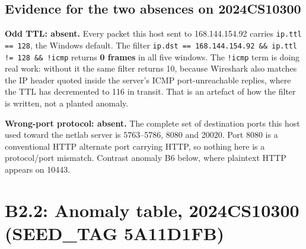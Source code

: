 \subsection{Evidence for the two absences on 2024CS10300}

\textbf{Odd TTL: absent.} Every packet this host sent to 168.144.154.92 carries
\texttt{ip.ttl == 128}, the Windows default. The filter
\texttt{ip.dst == 168.144.154.92 \&\& ip.ttl != 128 \&\& !icmp} returns \textbf{0 frames} in all
five windows. The \texttt{!icmp} term is doing real work: without it the same filter returns 10,
because Wireshark also matches the IP header quoted inside the server's ICMP port-unreachable
replies, where the TTL has decremented to 116 in transit. That is an artefact of how the filter
is written, not a planted anomaly.

\textbf{Wrong-port protocol: absent.} The complete set of destination ports this host used
toward the netlab server is 5763--5786, 8080 and 20020. Port 8080 is a conventional HTTP
alternate port carrying HTTP, so nothing here is a protocol/port mismatch. Contrast anomaly B6
below, where plaintext HTTP appears on 10443.

\section{B2.2: Anomaly table, 2024CS10300 (SEED\_TAG 5A11D1FB)}

